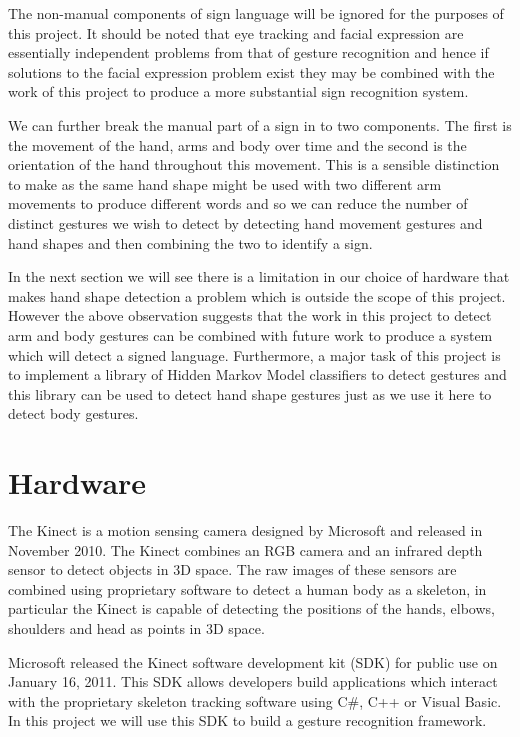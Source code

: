 The non-manual components of sign language will be ignored for the purposes of this project. It should be noted that eye tracking and facial expression are essentially independent problems from that of gesture recognition and hence if solutions to the facial expression problem exist they may be combined with the work of this project to produce a more substantial sign recognition system.

We can further break the manual part of a sign in to two components. The first is the movement of the hand, arms and body over time and the second is the orientation of the hand throughout this movement. This is a sensible distinction to make as the same hand shape might be used with two different arm movements to produce different words and so we can reduce the number of distinct gestures we wish to detect by detecting hand movement gestures and hand shapes and then combining the two to identify a sign.

In the next section we will see there is a limitation in our choice of hardware that makes hand shape detection a problem which is outside the scope of this project. However the above observation suggests that the work in this project to detect arm and body gestures can be combined with future work to produce a system which will detect a signed language. Furthermore, a major task of this project is to implement a library of Hidden Markov Model classifiers to detect gestures and this library can be used to detect hand shape gestures just as we use it here to detect body gestures. 

\section{Hardware}
The Kinect is a motion sensing camera designed by Microsoft and released in November 2010. The Kinect combines an RGB camera and an infrared depth sensor to detect objects in 3D space. The raw images of these sensors are combined using proprietary software to detect a human body as a skeleton, in particular the Kinect is capable of detecting the positions of the hands, elbows, shoulders and head as points in 3D space.

Microsoft released the Kinect software development kit (SDK) for public use on January 16, 2011. This SDK allows developers build applications which interact with the proprietary skeleton tracking software using C\#, C++ or Visual Basic. In this project we will use this SDK to build a gesture recognition framework.

